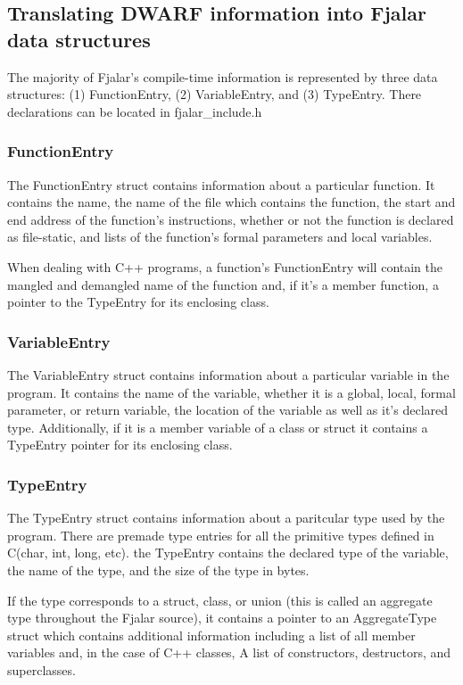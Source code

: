 \documentclass[11pt]{article}
\begin{document}
\subsection{Translating DWARF information into Fjalar data structures}
The majority of Fjalar's compile-time information is represented by
three data structures: (1) FunctionEntry, (2) VariableEntry, and (3)
TypeEntry. There declarations can be located in fjalar\_include.h

\subsubsection{FunctionEntry}
The FunctionEntry struct contains information about a particular
function. It contains the name, the name of the file which  
contains the function, the start and end address of the function's 
instructions, whether or not the function is declared as file-static,
and lists of the function's formal parameters and local variables. 

When dealing with C++ programs, a function's FunctionEntry will  
contain the mangled and demangled name of the function and, if it's a
member function, a pointer to the TypeEntry for its enclosing class.

\subsubsection{VariableEntry}
The VariableEntry struct contains information about a particular
variable in the program. It contains the name of the variable, whether
it is a global, local, formal parameter, or return variable, the
location of the variable as well as it's declared type. Additionally,
if it is a member variable of a class or struct it contains a
TypeEntry pointer for its enclosing class.


\subsubsection{TypeEntry}
The TypeEntry struct contains information about a paritcular type used
by the program. There are premade type entries for all the primitive
types defined in C(char, int, long, etc). the TypeEntry contains the
declared type of the variable, the name of the type, and the size of
the type in bytes.

If the type corresponds to a struct, class, or union (this is called
an aggregate type throughout the Fjalar source), it contains a pointer
to an AggregateType struct which contains additional information
including a list of all member variables and, in the case of C++
classes, A list of constructors, destructors, and superclasses.
\end{document}
